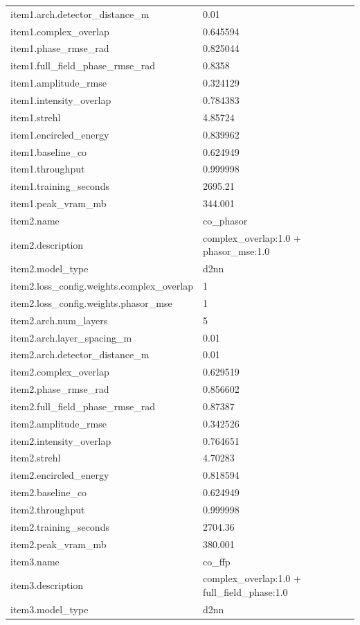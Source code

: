 \begin{longtable}{p{}p{}}
item1.arch.detector\_distance\_m & 0.01\\
item1.complex\_overlap & 0.645594\\
item1.phase\_rmse\_rad & 0.825044\\
item1.full\_field\_phase\_rmse\_rad & 0.8358\\
item1.amplitude\_rmse & 0.324129\\
item1.intensity\_overlap & 0.784383\\
item1.strehl & 4.85724\\
item1.encircled\_energy & 0.839962\\
item1.baseline\_co & 0.624949\\
item1.throughput & 0.999998\\
item1.training\_seconds & 2695.21\\
item1.peak\_vram\_mb & 344.001\\
item2.name & co\_phasor\\
item2.description & complex\_overlap:1.0 + phasor\_mse:1.0\\
item2.model\_type & d2nn\\
item2.loss\_config.weights.complex\_overlap & 1\\
item2.loss\_config.weights.phasor\_mse & 1\\
item2.arch.num\_layers & 5\\
item2.arch.layer\_spacing\_m & 0.01\\
item2.arch.detector\_distance\_m & 0.01\\
item2.complex\_overlap & 0.629519\\
item2.phase\_rmse\_rad & 0.856602\\
item2.full\_field\_phase\_rmse\_rad & 0.87387\\
item2.amplitude\_rmse & 0.342526\\
item2.intensity\_overlap & 0.764651\\
item2.strehl & 4.70283\\
item2.encircled\_energy & 0.818594\\
item2.baseline\_co & 0.624949\\
item2.throughput & 0.999998\\
item2.training\_seconds & 2704.36\\
item2.peak\_vram\_mb & 380.001\\
item3.name & co\_ffp\\
item3.description & complex\_overlap:1.0 + full\_field\_phase:1.0\\
item3.model\_type & d2nn\\

\end{longtable}
